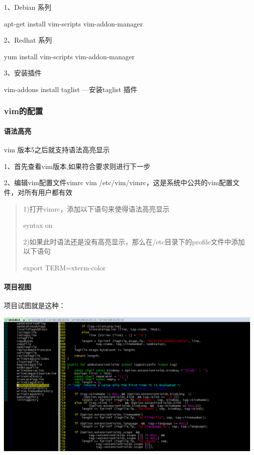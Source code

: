 \documentclass[letterpaper,10pt]{sphinxmanual}
\begin{document}
1、Debian 系列

apt-get install vim-scripts vim-addon-manager

2、Redhat 系列

yum install vim-scripts vim-addon-manager

3、安装插件

vim-addons install taglist   ---安装taglist 插件


\subsubsection{vim的配置}
\label{Linux_vim/install:id3}

\paragraph{语法高亮}
\label{Linux_vim/install:id4}
vim 版本5之后就支持语法高亮显示

1、首先查看vim版本,如果符合要求则进行下一步

2、编辑vim配置文件vimrc  vim /etc/vim/vimrc，这是系统中公共的vim配置文件，对所有用户都有效
\begin{quote}

1)打开vimrc，添加以下语句来使得语法高亮显示

syntax on

2)如果此时语法还是没有高亮显示，那么在/etc目录下的profile文件中添加以下语句

export TERM=xterm-color
\end{quote}


\paragraph{项目视图}
\label{Linux_vim/install:id5}
项目试图就是这种：

\includegraphics{view.png}
\end{document}
